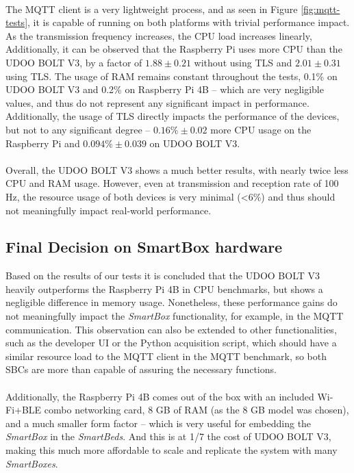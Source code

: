 \paragraph{} The \acs{MQTT} client is a very lightweight process, and as seen in Figure \ref{fig:mqtt-tests}, it is capable of running on both platforms with trivial performance impact. As the transmission frequency increases, the \acs{CPU} load increases linearly, Additionally, it can be observed that the Raspberry Pi uses more \acs{CPU} than the UDOO BOLT V3, by a factor of $1.88 \pm 0.21$ without using \acs{TLS} and $2.01 \pm 0.31$ using \acs{TLS}. The usage of \acs{RAM} remains constant throughout the tests, 0.1\% on UDOO BOLT V3 and 0.2\% on Raspberry Pi 4B -- which are very negligible values, and thus do not represent any significant impact in performance. Additionally, the usage of \acs{TLS} directly impacts the performance of the devices, but not to any significant degree -- $0.16\% \pm 0.02$ more \acs{CPU} usage on the Raspberry Pi and $0.094\% \pm 0.039$ on UDOO BOLT V3.

\paragraph{} Overall, the UDOO BOLT V3 shows a much better results, with nearly twice less \acs{CPU} and \acs{RAM} usage. However, even at transmission and reception rate of 100 Hz, the resource usage of both devices is very minimal (<6\%) and thus should not meaningfully impact real-world performance.

\subsection{Final Decision on SmartBox hardware}

Based on the results of our tests it is concluded that the UDOO BOLT V3 heavily outperforms the Raspberry Pi 4B in \acs{CPU} benchmarks, but shows a negligible difference in memory usage. Nonetheless, these performance gains do not meaningfully impact the \textit{SmartBox} functionality, for example, in the \acs{MQTT} communication. This observation can also be extended to other functionalities, such as the developer \acs{UI} or the Python acquisition script, which should have a similar resource load to the \acs{MQTT} client in the \acs{MQTT} benchmark, so both \acs{SBC}s are more than capable of assuring the necessary functions.

\paragraph{} Additionally, the Raspberry Pi 4B comes out of the box with an included Wi-Fi+\acs{BLE} combo networking card, 8 GB of \acs{RAM} (as the 8 GB model was chosen), and a much smaller form factor -- which is very useful for embedding the \textit{SmartBox} in the \textit{SmartBeds}. And this is at 1/7 the cost of UDOO BOLT V3, making this much more affordable to scale and replicate the system with many \textit{SmartBoxes}.

